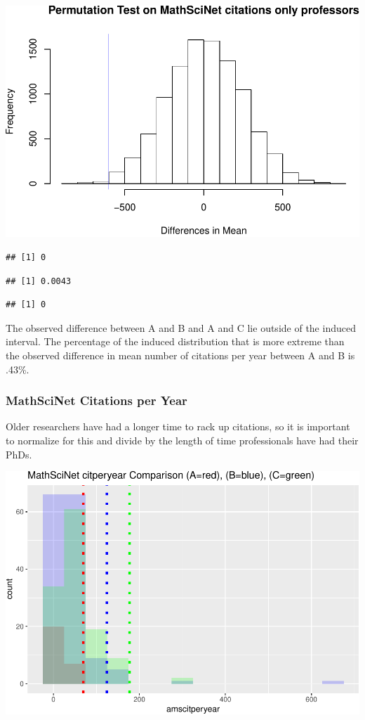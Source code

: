 \documentclass[]{article}
\begin{document}
\includegraphics{final_files/figure-latex/unnamed-chunk-31-1.pdf}

\begin{verbatim}
## [1] 0
\end{verbatim}

\begin{verbatim}
## [1] 0.0043
\end{verbatim}

\begin{verbatim}
## [1] 0
\end{verbatim}

The observed difference between A and B and A and C lie outside of the
induced interval. The percentage of the induced distribution that is
more extreme than the observed difference in mean number of citations
per year between A and B is .43\%.

\hypertarget{mathscinet-citations-per-year}{%
\subsubsection{MathSciNet Citations per
Year}\label{mathscinet-citations-per-year}}

Older researchers have had a longer time to rack up citations, so it is
important to normalize for this and divide by the length of time
professionals have had their PhDs.

\includegraphics{final_files/figure-latex/unnamed-chunk-33-1.pdf}
\end{document}
